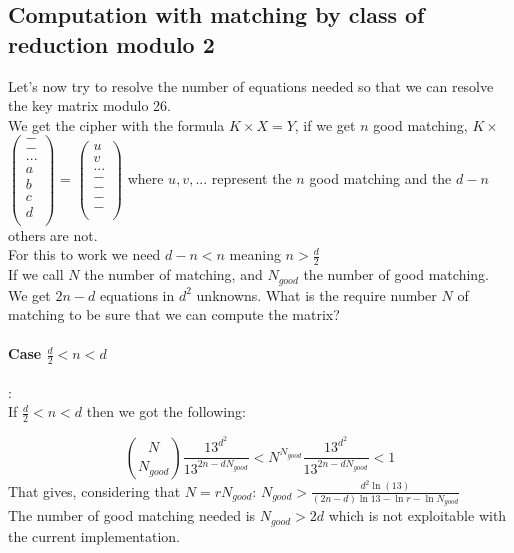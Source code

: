 \documentclass{article}
\begin{document}
\subsection{Computation with matching by class of reduction modulo 2}
Let's now try to resolve the number of equations needed so that we can resolve the key matrix modulo 26.\\
We get the cipher with the formula $ K \times X = Y$, if we get $n$ good matching, $ K \times $  $\begin{pmatrix}
  - \\
  - \\
 ... \\
  a \\
	b\\
	c\\
	d\\
 \end{pmatrix} $
 = $\begin{pmatrix}
  u \\
  v \\
 ... \\
  - \\
	-\\
	-\\
	-\\
 \end{pmatrix}$
where $ u, v,... $ represent the $n$ good matching and the $d-n $ others are not.\\
For this to work we need $d-n < n $ meaning $n > \frac{d}{2}$\\
If we call $N$ the number of matching, and $N_{good}$ the number of good matching.\\
We get $2n-d$ equations in $d^2$ unknowns.
What is the require number $N$ of matching to be sure that we can compute the matrix?\\
\paragraph{Case $\frac{d}{2} < n < d $}:\\

If $ \frac{d}{2} < n < d $ then we got the following:

$${N \choose N_{good}} \frac{13^{d^{2}}}{13^{2n-d N_{good}}} <  N^{N_{good}} \frac{13^{d^{2}}}{13^{2n-d N_{good}}} < 1$$
That gives, considering that $N = r N_{good}$: $N_{good} > \frac{d^{2} \ln(13)}{(2n-d)\ln 13 - \ln r - \ln N_{good}}$\\
The number of good matching needed is $N_{good} > 2d$ which is not exploitable with the current implementation.\\
\end{document}
